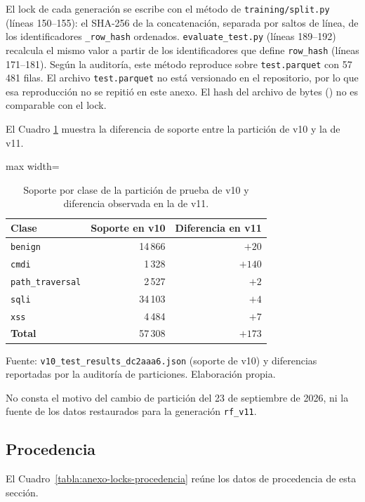 El lock de cada generación se escribe con el método de \texttt{training/split.py} (líneas 150--155): el SHA-256 de la concatenación, separada por saltos de línea, de los identificadores \texttt{\_row\_hash} ordenados. \texttt{evaluate\_test.py} (líneas 189--192) recalcula el mismo valor a partir de los identificadores que define \texttt{row\_hash} (líneas 171--181). Según la auditoría, este método reproduce  sobre \texttt{test.parquet} con 57\,481 filas. El archivo \texttt{test.parquet} no está versionado en el repositorio, por lo que esa reproducción no se repitió en este anexo. El hash del archivo de bytes () no es comparable con el lock.

El Cuadro \ref{tabla:anexo-locks-soporte} muestra la diferencia de soporte entre la partición de v10 y la de v11.

\begin{table}[htbp]
\centering
\footnotesize
\begin{adjustbox}{max width=\linewidth}
\begin{tabular}{|l|r|r|}
\hline
\textbf{Clase} & \textbf{Soporte en v10} & \textbf{Diferencia en v11} \\ \hline
\texttt{benign} & 14\,866 & $+20$ \\ \hline
\texttt{cmdi} & 1\,328 & $+140$ \\ \hline
\texttt{path\_traversal} & 2\,527 & $+2$ \\ \hline
\texttt{sqli} & 34\,103 & $+4$ \\ \hline
\texttt{xss} & 4\,484 & $+7$ \\ \hline
\textbf{Total} & 57\,308 & $+173$ \\ \hline
\end{tabular}
\end{adjustbox}
\caption{Soporte por clase de la partición de prueba de v10 y diferencia observada en la de v11.}
\label{tabla:anexo-locks-soporte}
\par\smallskip\footnotesize Fuente: \texttt{v10\_test\_results\_dc2aaa6.json} (soporte de v10) y diferencias reportadas por la auditoría de particiones. Elaboración propia.
\end{table}

No consta el motivo del cambio de partición del 23 de septiembre de 2026, ni la fuente de los datos restaurados para la generación \texttt{rf\_v11}.

\subsection{Procedencia}
El Cuadro~\ref{tabla:anexo-locks-procedencia} reúne los datos de procedencia de esta sección.


